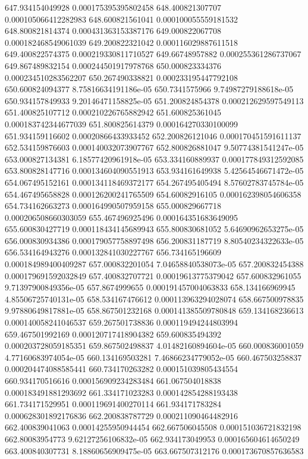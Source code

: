 {647.934154049928 0.000175395395802458
648.400821307707 0.000105066412282983
648.600821561041 0.000100055559181532
648.800821814374 0.000431363153387176
649.000822067708 0.000182468549061039
649.200822321042 0.000116029887611518
649.400822574375 0.000219330811710527
649.66748957882 0.000255361286737067
649.867489832154 0.000244501917978768
650.000823334376 0.000234510283562207
650.267490338821 0.000233195447792108
650.600824094377 8.75816634191186e-05
650.7341575966 9.74987279188618e-05
650.934157849933 9.20146471158825e-05
651.200824854378 0.000212629597549113
651.400825107712 0.000210226765882942
651.600825361045 0.000183742344677039
651.800825614379 0.000164270330100099
651.934159116602 0.00020866433933452
652.200826121046 0.000170451591611137
652.534159876603 0.000140032073907767
652.800826881047 9.50774381541247e-05
653.000827134381 6.18577420961918e-05
653.334160889937 0.000177849312592085
653.800828147716 0.000134604090551913
653.934161649938 5.42564546671472e-05
654.067495152161 0.000134118469372177
654.267495405494 8.57602783745784e-05
654.467495658828 0.000126200241765509
654.60082916105 0.000162398054606358
654.734162663273 0.000164990507959158
655.000829667718 0.000206508660303059
655.467496925496 0.000164351683649095
655.600830427719 0.000118434145689943
655.800830681052 5.64690962653275e-05
656.000830934386 0.000179057758897498
656.200831187719 8.80540234322633e-05
656.534164943276 0.000132841030227767
656.734165196609 0.000184989400409287
657.000832201054 7.04658840538073e-05
657.200832454388 0.000179691592032849
657.400832707721 0.00019613775379042
657.600832961055 9.71397900849356e-05
657.8674999655 0.000191457004063833
658.134166969945 4.85506725740131e-05
658.534167476612 0.000113963294028074
658.667500978835 9.97880649817881e-05
658.867501232168 0.000141385509780848
659.134168236613 0.000140058241046537
659.267501738836 0.000119494244803994
659.467501992169 0.000120717418904382
659.600835494392 0.000203728059185351
659.867502498837 4.01482160894604e-05
660.000836001059 4.77160683974054e-05
660.134169503281 7.46866234779052e-05
660.467503258837 0.000204474088585441
660.734170263282 0.000151039805434554
660.934170516616 0.000156909234283484
661.067504018838 0.000183491881293692
661.334171023283 0.000142854288193438
661.734171529951 0.000119691400270114
661.934171783284 0.000628301892176836
662.200838787729 0.000211090464482916
662.400839041063 0.00014255950944454
662.667506045508 0.000151036721832198
662.80083954773 9.62127256106832e-05
662.934173049953 0.000165604614650249
663.400840307731 8.18860656909475e-05
663.667507312176 0.000173670857636583
}
